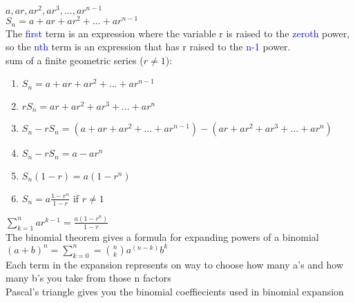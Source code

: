 \documentclass{article}
\begin{document}
$a, ar, ar^2, ar^3, \ldots, ar^{n-1}$\\
$S_n = a + ar + ar^2 + \ldots + ar^{n-1}$\\

The \textcolor{blue}{first} term is an expression where the variable r is raised to the \textcolor{blue}{zeroth} power, so the \textcolor{blue}{nth} term is an expression that has r raised to the \textcolor{blue}{n-1} power.\\ 

sum of a finite geometric series ($r \neq 1$):
	\begin{enumerate}
		\item $S_n = a + ar + ar^2 + \ldots + ar^{n-1}$ 
		\item $rS_n = ar + ar^2 + ar^3 + \ldots + ar^{n}$   
		\item $S_n - rS_n = (a + ar + ar^2 + \ldots + ar^{n-1}) - (ar + ar^2 + ar^3 + \ldots + ar^{n})$
		\item $S_n - rS_n = a - ar^n$
		\item $S_n(1 - r) = a(1 - r^n)$
		\item $S_n = a\frac{1 - r^n}{1 - r}$ if $r \neq 1$ 
	\end{enumerate}

$\sum_{k = 1}^{n} ar^{k - 1} = \frac{a(1-r^n)}{1 - r}$\\

The binomial theorem gives a formula for expanding powers of a binomial\\

$(a + b)^n = \sum_{k = 0}^{n} = \binom{n}{k}a^{(n-k)}b^{k}$\\

Each term in the expansion represents on way to choose how many a's and how many b's you take from those n factors\\

Pascal's triangle gives you the binomial coeffiecients used in binomial expansion\\

\begin{center}
\end{center}
\end{document}
